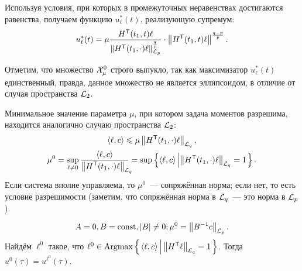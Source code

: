 Используя условия, при которых в промежуточных неравенствах достигаются равенства, получаем
функцию $u_\ell^*(t)$, реализующую супремум:
\begin{equation*}
  u_{\ell}^{*}(t) = \mu \frac{H^{\mathsf{T}}(t_1, t) \ell}{\left\| H^{\mathsf{T}}(t_1, \cdot) \ell \right\|_{{\mathcal{L}_p}}^{\frac{q}{p}}} \cdot
    \left\| H^{\mathsf{T}}(t_1, t) \ell \right\|^{\frac{q - p}{p}}.
\end{equation*}

Отметим, что множество $\mathcal{X}_\mu^0$ строго выпукло, так как максимизатор $u_\ell^*(t)$ единственный,
правда, данное множество не является эллипсоидом, в отличие от случая пространства ${\mathcal{L}_2}$.

Минимальное значение параметра $\mu$, при котором задача моментов разрешима,
находится аналогично случаю пространства ${\mathcal{L}_2}$:
\begin{gather*}
	\scalar{\ell}{c} \leqslant \mu \norm{H^\tran(t_1, \cdot) \ell}_{\Lq},\\
	\mu^0 = \sup\limits_{\ell \neq 0}
	  \frac{\scalar{\ell}{c}}{\lefteqn{\norm{H^\tran(t_1, \cdot) \ell}_\Lq}\phantom{\norm{H^\tran(t_1, \cdot) \ell}_0}} =
	\sup \left\lbrace \scalar{\ell}{c} \left| \norm{H^\tran(t_1, \cdot) \ell}_{\Lq} = 1 \right. \right\rbrace.
\end{gather*}
%
%
Если система вполне управляема, то $\mu^0$~--- сопряжённая норма; если нет, то есть условие разрешимости
(заметим, что сопряжённая норма в ${\mathcal{L}_q}$~--- это норма в ${\mathcal{L}_p}$). %

\begin{ex}
	\begin{equation*}
		A = 0, B = \operatorname{const}, \left| B \right| \neq 0; \mu^0 = \left\| B^{-1} c \right\|_{\mathcal{L}_p}.
	\end{equation*}
	Найдём $\ell^0$ такое, что $\ell^0 \in \operatorname{Argmax} \left\{\, \left<\ell,c\right> \,\middle|\, \left\| H^{\mathsf{T}} \ell \right\|_{\mathcal{L}_q} = 1 \,\right\}$.
	Тогда $u^0(\tau) = u^{\ell^0}(\tau)$.
\end{ex}